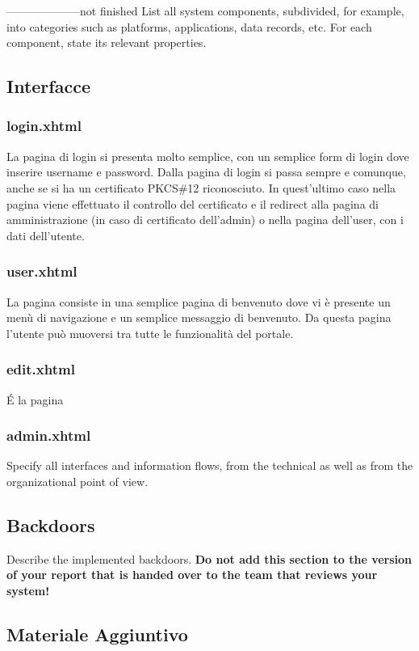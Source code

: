 \documentclass{article}
\begin{document}
 --------------------not finished
List all system components, subdivided, for example, into
  categories such as platforms, applications, data records, etc. For
  each component, state its relevant properties.


\subsection{Interfacce}
\subsubsection*{login.xhtml}
La pagina di login si presenta molto semplice, con un semplice form di login dove inserire username e password. Dalla pagina di login si passa sempre e comunque, anche se si ha un certificato PKCS\#12 riconosciuto. In quest'ultimo caso nella pagina viene effettuato il controllo del certificato e il redirect alla pagina di amministrazione (in caso di certificato dell'admin) o nella pagina dell'user, con i dati dell'utente.
\subsubsection*{user.xhtml}
La pagina consiste in una semplice pagina di benvenuto dove vi è presente un menù di navigazione e un semplice messaggio di benvenuto. Da questa pagina l'utente può muoversi tra tutte le funzionalità del portale.
\subsubsection*{edit.xhtml}
\'E la pagina 
\subsubsection*{admin.xhtml}
Specify  all interfaces and  information flows, from the technical as well as from the
  organizational point of view.

\subsection{Backdoors}

Describe the implemented backdoors. {\bfseries Do not add
    this section to the version of your report that is handed over to
    the team that reviews your system!}

\subsection{Materiale Aggiuntivo}
\end{document}
